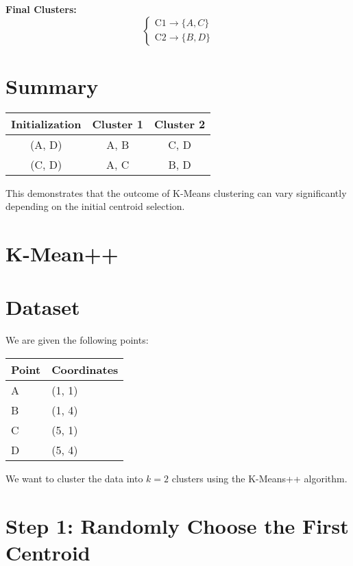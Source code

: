 \documentclass{article}
\begin{document}
\textbf{Final Clusters:}
\[
\begin{cases}
\text{C1} \rightarrow \{ A, C \} \\
\text{C2} \rightarrow \{ B, D \}
\end{cases}
\]

\section*{Summary}

\begin{center}
\begin{tabular}{ccc}
\toprule
Initialization & Cluster 1 & Cluster 2 \\
\midrule
(A, D) & A, B & C, D \\
(C, D) & A, C & B, D \\
\bottomrule
\end{tabular}
\end{center}

\noindent This demonstrates that the outcome of K-Means clustering can vary significantly depending on the initial centroid selection.


\section{K-Mean++}

\section*{Dataset}

We are given the following points:

\begin{center}
\begin{tabular}{ll}
\toprule
Point & Coordinates \\
\midrule
A & (1, 1) \\
B & (1, 4) \\
C & (5, 1) \\
D & (5, 4) \\
\bottomrule
\end{tabular}
\end{center}

We want to cluster the data into \( k = 2 \) clusters using the K-Means++ algorithm.

\section*{Step 1: Randomly Choose the First Centroid}
\end{document}
